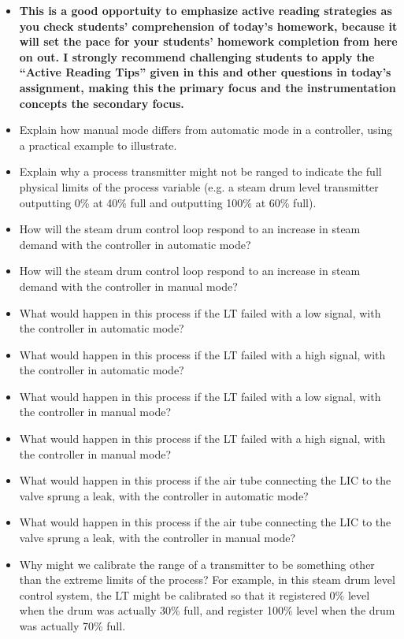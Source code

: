 \begin{itemize}
\item{} {\bf This is a good opportuity to emphasize active reading strategies as you check students' comprehension of today's homework, because it will set the pace for your students' homework completion from here on out.  I strongly recommend challenging students to apply the ``Active Reading Tips'' given in this and other questions in today's assignment, making this the primary focus and the instrumentation concepts the secondary focus.}
\item{} Explain how manual mode differs from automatic mode in a controller, using a practical example to illustrate.
\item{} Explain why a process transmitter might not be ranged to indicate the full physical limits of the process variable (e.g. a steam drum level transmitter outputting 0\% at 40\% full and outputting 100\% at 60\% full).
\item{} How will the steam drum control loop respond to an increase in steam demand with the controller in automatic mode?
\item{} How will the steam drum control loop respond to an increase in steam demand with the controller in manual mode?
\item{} What would happen in this process if the LT failed with a low signal, with the controller in automatic mode?
\item{} What would happen in this process if the LT failed with a high signal, with the controller in automatic mode?
\item{} What would happen in this process if the LT failed with a low signal, with the controller in manual mode?
\item{} What would happen in this process if the LT failed with a high signal, with the controller in manual mode?
\item{} What would happen in this process if the air tube connecting the LIC to the valve sprung a leak, with the controller in automatic mode?
\item{} What would happen in this process if the air tube connecting the LIC to the valve sprung a leak, with the controller in manual mode?
\item{} Why might we calibrate the range of a transmitter to be something other than the extreme limits of the process?  For example, in this steam drum level control system, the LT might be calibrated so that it registered 0\% level when the drum was actually 30\% full, and register 100\% level when the drum was actually 70\% full.
\end{itemize}









